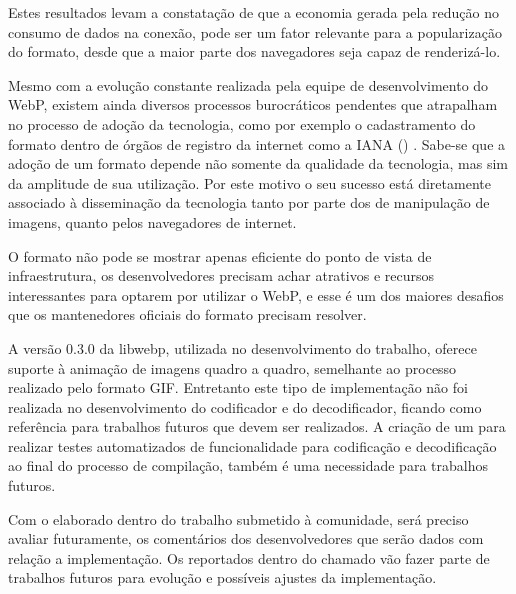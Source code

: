 \documentclass[espaco=simples,appendix=Name]{abnt}
\begin{document}
Estes resultados levam a constatação de que a economia gerada pela redução no consumo de dados na conexão, pode ser um fator relevante para a popularização do formato, desde que a maior parte dos navegadores seja capaz de renderizá-lo.

Mesmo com a evolução constante realizada pela equipe de desenvolvimento do WebP, existem ainda diversos processos burocráticos pendentes que atrapalham no processo de adoção da tecnologia, como por exemplo o cadastramento do formato dentro de órgãos de registro da internet como a IANA () \cite{IANA}. Sabe-se que a adoção de um formato depende não somente da qualidade da tecnologia, mas sim da amplitude de sua utilização. Por este motivo o seu sucesso está diretamente associado à disseminação da tecnologia tanto por parte dos  de manipulação de imagens, quanto pelos navegadores de internet. 

O formato não pode se mostrar apenas eficiente do ponto de vista de infraestrutura, os desenvolvedores precisam achar atrativos e recursos interessantes para optarem por utilizar o WebP, e esse é um dos maiores desafios que os mantenedores oficiais do formato precisam resolver.

A versão 0.3.0 da libwebp, utilizada no desenvolvimento do trabalho, oferece suporte à animação de imagens quadro a quadro, semelhante ao processo realizado pelo formato GIF. Entretanto este tipo de implementação não foi realizada no desenvolvimento do codificador e do decodificador, ficando como referência para trabalhos futuros que devem ser realizados. A criação de um  para realizar testes automatizados de funcionalidade para codificação e decodificação ao final do processo de compilação, também é uma necessidade para trabalhos futuros.

Com o  elaborado dentro do trabalho submetido à comunidade, será preciso avaliar futuramente, os comentários dos desenvolvedores que serão dados com relação a implementação. Os  reportados dentro do chamado vão fazer parte de trabalhos futuros para evolução e possíveis ajustes da implementação.


\end{document}
